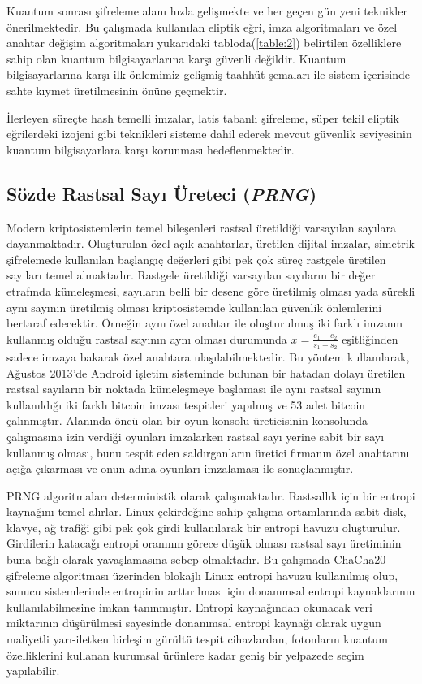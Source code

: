\documentclass[a4paper,11pt]{article}
\begin{document}
Kuantum sonrası şifreleme alanı hızla gelişmekte ve her geçen gün yeni teknikler önerilmektedir. Bu çalışmada kullanılan eliptik eğri, imza algoritmaları ve özel anahtar değişim algoritmaları yukarıdaki tabloda(\ref{table:2}) belirtilen özelliklere sahip olan kuantum bilgisayarlarına karşı güvenli değildir. Kuantum bilgisayarlarına karşı ilk önlemimiz gelişmiş taahhüt şemaları ile sistem içerisinde sahte kıymet üretilmesinin önüne geçmektir.

İlerleyen süreçte hash temelli imzalar, latis tabanlı şifreleme, süper tekil eliptik eğrilerdeki izojeni gibi teknikleri sisteme dahil ederek mevcut güvenlik seviyesinin kuantum bilgisayarlara karşı korunması hedeflenmektedir.


\subsection{Sözde Rastsal Sayı Üreteci (\emph{PRNG})}

Modern kriptosistemlerin temel bileşenleri rastsal üretildiği varsayılan sayılara dayanmaktadır. Oluşturulan özel-açık anahtarlar, üretilen dijital imzalar, simetrik şifrelemede kullanılan başlangıç değerleri gibi pek çok süreç rastgele üretilen sayıları temel almaktadır. Rastgele üretildiği varsayılan sayıların bir değer etrafında kümeleşmesi, sayıların belli bir desene göre üretilmiş olması yada sürekli aynı sayının üretilmiş olması kriptosistemde kullanılan güvenlik önlemlerini bertaraf edecektir. Örneğin aynı özel anahtar ile oluşturulmuş iki farklı imzanın kullanmış olduğu rastsal sayının aynı olması durumunda $x=\frac{e_{1} - e_{2}}{s_{1} - s_{2}}$ eşitliğinden sadece imzaya bakarak özel anahtara ulaşılabilmektedir. Bu yöntem kullanılarak, Ağustos 2013'de Android işletim sisteminde bulunan bir hatadan dolayı üretilen rastsal sayıların bir noktada kümeleşmeye başlaması ile aynı rastsal sayının kullanıldığı iki farklı bitcoin imzası tespitleri yapılmış ve 53 adet bitcoin çalınmıştır. Alanında öncü olan bir oyun konsolu üreticisinin konsolunda çalışmasına izin verdiği oyunları imzalarken rastsal sayı yerine sabit bir sayı kullanmış olması, bunu tespit eden saldırganların üretici firmanın özel anahtarını açığa çıkarması ve onun adına oyunları imzalaması ile sonuçlanmıştır.

PRNG algoritmaları deterministik olarak çalışmaktadır. Rastsallık için bir entropi kaynağını temel alırlar. Linux çekirdeğine sahip çalışma ortamlarında sabit disk, klavye, ağ trafiği gibi pek çok girdi kullanılarak bir entropi havuzu oluşturulur. Girdilerin katacağı entropi oranının görece düşük olması rastsal sayı üretiminin buna bağlı olarak yavaşlamasına sebep olmaktadır. Bu çalışmada ChaCha20\cite{chacha} şifreleme algoritması üzerinden blokajlı Linux entropi havuzu kullanılmış olup, sunucu sistemlerinde entropinin arttırılması için donanımsal entropi kaynaklarının kullanılabilmesine imkan tanınmıştır. Entropi kaynağından okunacak veri miktarının düşürülmesi sayesinde donanımsal entropi kaynağı olarak uygun maliyetli yarı-iletken birleşim gürültü tespit cihazlardan, fotonların kuantum özelliklerini kullanan kurumsal ürünlere kadar geniş bir yelpazede seçim yapılabilir.
\end{document}

